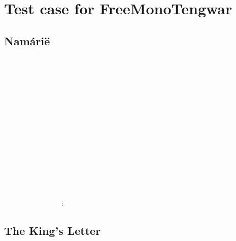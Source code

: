 \documentclass[11pt,a4paper]{article}
\begin{document}
\section*{Test case for FreeMonoTengwar}

\subsection*{Namárië}
\freemonotengwar
       \\
        \\
     \\
       \\
  

       \\
       \\
      \\
     \\
        \\
      

   

    :

\subsection*{The King’s Letter}
\begin{center}
\freemonotengwar
  \\
   \\
   \\
     \\
    \\
     \\
     \\
       \\
    \\
    \\
    \\
   ‍ 
\end{center}
\end{document}
